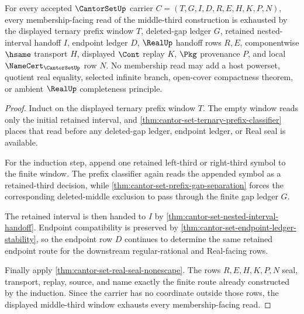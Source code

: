 \begin{theorem}
\label{thm:cantor-set-middle-third-window-exhaustion}
For every accepted $\CantorSetUp$ carrier $C=(T,G,I,D,R,E,H,K,P,N)$, every membership-facing read of the middle-third construction is exhausted by the displayed ternary prefix window $T$, deleted-gap ledger $G$, retained nested-interval handoff $I$, endpoint ledger $D$, $\RealUp$ handoff rows $R,E$, componentwise $\hsame$ transport $H$, displayed $\Cont$ replay $K$, $\Pkg$ provenance $P$, and local $\NameCert_{\CantorSetUp}$ row $N$. No membership read may add a host powerset, quotient real equality, selected infinite branch, open-cover compactness theorem, or ambient $\RealUp$ completeness principle.
\end{theorem}
\begin{proof}
Induct on the displayed ternary prefix window $T$. The empty window reads only the initial retained interval, and \autoref{thm:cantor-set-ternary-prefix-classifier} places that read before any deleted-gap ledger, endpoint ledger, or Real seal is available.

For the induction step, append one retained left-third or right-third symbol to the finite window. The prefix classifier again reads the appended symbol as a retained-third decision, while \autoref{thm:cantor-set-prefix-gap-separation} forces the corresponding deleted-middle exclusion to pass through the finite gap ledger $G$.

The retained interval is then handed to $I$ by \autoref{thm:cantor-set-nested-interval-handoff}. Endpoint compatibility is preserved by \autoref{thm:cantor-set-endpoint-ledger-stability}, so the endpoint row $D$ continues to determine the same retained endpoint route for the downstream regular-rational and Real-facing rows.

Finally apply \autoref{thm:cantor-set-real-seal-nonescape}. The rows $R,E,H,K,P,N$ seal, transport, replay, source, and name exactly the finite route already constructed by the induction. Since the carrier has no coordinate outside those rows, the displayed middle-third window exhausts every membership-facing read.
\end{proof}

